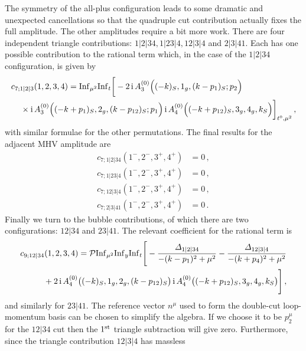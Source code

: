 The symmetry of the all-plus configuration leads to some dramatic and
unexpected cancellations so that the quadruple cut contribution actually fixes
the full amplitude. The other amplitudes require a bit more work. There are
four independent triangle contributions: $1|2|34, 1|23|4, 12|3|4$ and $2|3|41$.
Each has one possible contribution to the rational term which, in the case of
the $1|2|34$ configuration, is given by
\begin{align}
\begin{aligned}
  & c_{7;1|2|3}(1,2,3,4) = {\rm Inf}_{\mu^2} {\rm Inf}_t \bigg[
    -2 \, \mathrm{i} \, A^{(0)}_3\Bigl((-k)_S, 1_g, (k-p_1)_S; p_2\Bigr) \\
    & \hspace{0.4cm} \times \mathrm{i} \, A^{(0)}_3\Bigl((-k+p_1)_S, 2_g, (k-p_{12})_S; p_1\Bigr) \,
    \mathrm{i} \, A^{(0)}_4\Bigl((-k+p_{12})_S, 3_g, 4_g, k_S\Bigr)\bigg]_{t^0,\mu^2} \,,
\end{aligned}
\end{align}
with similar formulae for the other permutations. The final results for the adjacent MHV amplitude are
\begin{align}
  c_{7;1|2|34}(1^-,2^-,3^+,4^+) &= 0 \,, \\
  c_{7;1|23|4}(1^-,2^-,3^+,4^+) &= 0 \,, \\
  c_{7;12|3|4}(1^-,2^-,3^+,4^+) &= 0 \,, \\
  c_{7;2|3|41}(1^-,2^-,3^+,4^+) &= 0 \,.
\end{align}
Finally we turn to the bubble contributions, of which there are two configurations: $12|34$ and $23|41$. The relevant coefficient for the rational term is
\begin{align}
\begin{aligned}
  & c_{9;12|34}(1,2,3,4) =\mathcal{P} {\rm Inf}_{\mu^2}  {\rm Inf}_y {\rm Inf}_t \Bigg[
        - \frac{\Delta_{1|2|34}}{-(k-p_1)^2+\mu^2} - \frac{\Delta_{12|3|4}}{-(k+p_4)^2+\mu^2} \\
    & \hspace{1cm} +  2 \, \i \, A^{(0)}_4\bigl((-k)_S, 1_g, 2_g, (k-p_{12})_S\bigr) \, \i \, A^{(0)}_4\bigl((-k+p_{12})_S, 3_g, 4_g, k_S\bigr) \Bigg] \,,
\end{aligned}
\end{align}
and similarly for $23|41$. The reference vector $n^\mu$ used to form the double-cut loop-momentum basis can be chosen to simplify the algebra. If we choose it
to be $p_2^\mu$ for the $12|34$ cut then the $1^{\rm st}$ triangle subtraction will give
zero. Furthermore, since the triangle contribution $12|3|4$ has massless
